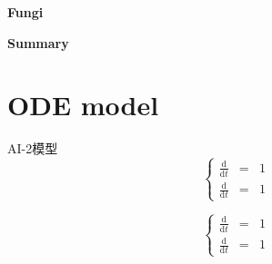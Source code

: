\documentclass[12pt]{article}
\begin{document}
\graphicspath{{.}}  %
\thispagestyle{empty}



\vspace{20pt}
\centerline{{\Large \textbf{Fungi}}}
\vspace{15pt}

\centerline{{\large \textbf{Summary}}}
\vspace{7pt}






\newpage
\thispagestyle{empty}
\setcounter{page}{0}
\tableofcontents                                                  %
\newpage                                                          %

\section{ODE model}
AI-2模型
\begin{equation}
    \left\{
    \begin{array}{lll}
        \frac{\mathrm{d}  }{\mathrm{d}t}  & = &  1\\
        \frac{\mathrm{d}  }{\mathrm{d}t}  & = &  1
    \end{array}\right.
\end{equation}

\begin{equation}
    \left\{
    \begin{array}{lll}
        \frac{\mathrm{d}  }{\mathrm{d}t}  & = &  1\\
        \frac{\mathrm{d}  }{\mathrm{d}t}  & = &  1
    \end{array}\right.
\end{equation}


\end{document}
